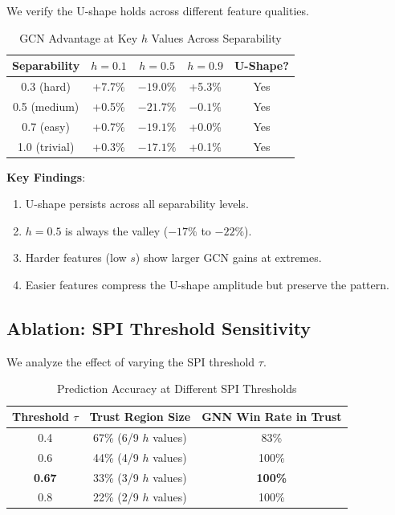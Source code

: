 We verify the U-shape holds across different feature qualities.

\begin{table}[t]
\centering
\caption{GCN Advantage at Key $h$ Values Across Separability}
\label{tab:separability}
\begin{tabular}{@{}ccccc@{}}
\toprule
Separability & $h=0.1$ & $h=0.5$ & $h=0.9$ & U-Shape? \\
\midrule
0.3 (hard) & +7.7\% & $-19.0\%$ & +5.3\% & Yes \\
0.5 (medium) & +0.5\% & $-21.7\%$ & $-0.1\%$ & Yes \\
0.7 (easy) & +0.7\% & $-19.1\%$ & +0.0\% & Yes \\
1.0 (trivial) & +0.3\% & $-17.1\%$ & +0.1\% & Yes \\
\bottomrule
\end{tabular}
\end{table}

\textbf{Key Findings}:
\begin{enumerate}
    \item U-shape persists across all separability levels.
    \item $h=0.5$ is always the valley ($-17\%$ to $-22\%$).
    \item Harder features (low $s$) show larger GCN gains at extremes.
    \item Easier features compress the U-shape amplitude but preserve the pattern.
\end{enumerate}

\subsection{Ablation: SPI Threshold Sensitivity}

We analyze the effect of varying the SPI threshold $\tau$.

\begin{table}[t]
\centering
\caption{Prediction Accuracy at Different SPI Thresholds}
\label{tab:threshold}
\begin{tabular}{@{}ccc@{}}
\toprule
Threshold $\tau$ & Trust Region Size & GNN Win Rate in Trust \\
\midrule
0.4 & 67\% (6/9 $h$ values) & 83\% \\
0.6 & 44\% (4/9 $h$ values) & 100\% \\
\textbf{0.67} & 33\% (3/9 $h$ values) & \textbf{100\%} \\
0.8 & 22\% (2/9 $h$ values) & 100\% \\
\bottomrule
\end{tabular}
\end{table}

